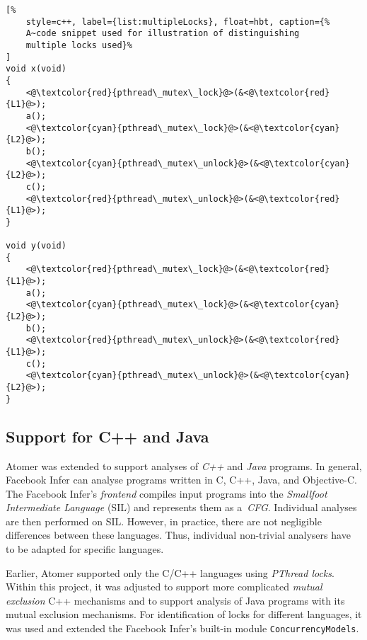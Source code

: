 \begin{lstlisting}[%
    style=c++, label={list:multipleLocks}, float=hbt, caption={%
    A~code snippet used for illustration of distinguishing
    multiple locks used}%
]
void x(void)
{
    <@\textcolor{red}{pthread\_mutex\_lock}@>(&<@\textcolor{red}{L1}@>);
    a();
    <@\textcolor{cyan}{pthread\_mutex\_lock}@>(&<@\textcolor{cyan}{L2}@>);
    b();
    <@\textcolor{cyan}{pthread\_mutex\_unlock}@>(&<@\textcolor{cyan}{L2}@>);
    c();
    <@\textcolor{red}{pthread\_mutex\_unlock}@>(&<@\textcolor{red}{L1}@>);
}

void y(void)
{
    <@\textcolor{red}{pthread\_mutex\_lock}@>(&<@\textcolor{red}{L1}@>);
    a();
    <@\textcolor{cyan}{pthread\_mutex\_lock}@>(&<@\textcolor{cyan}{L2}@>);
    b();
    <@\textcolor{red}{pthread\_mutex\_unlock}@>(&<@\textcolor{red}{L1}@>);
    c();
    <@\textcolor{cyan}{pthread\_mutex\_unlock}@>(&<@\textcolor{cyan}{L2}@>);
}
\end{lstlisting}

\subsection{Support for C++ and Java}

Atomer was extended to support analyses of \emph{C++} and \emph{Java}
programs. In general, Facebook Infer can analyse programs written in C, C++,
Java, and Objective-C. The Facebook Infer's \emph{frontend} compiles input
programs into the \emph{Smallfoot Intermediate Language} (SIL) and represents
them as a~\emph{CFG}. Individual analyses are then performed on SIL. However,
in practice, there are not negligible differences between these languages.
Thus, individual non-trivial analysers have to be adapted for specific
languages.

Earlier, Atomer supported only the C/C++ languages using \emph{PThread locks}.
Within this project, it was adjusted to support more complicated \emph{mutual
exclusion} C++ mechanisms and to support analysis of Java programs with its
mutual exclusion mechanisms. For identification of locks for different
languages, it was used and extended the Facebook Infer's built-in module
\texttt{ConcurrencyModels}.

